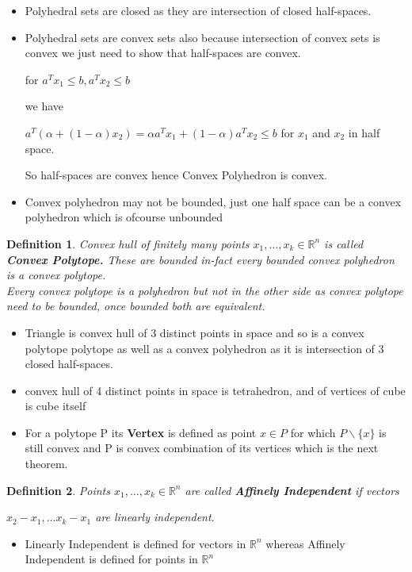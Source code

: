 \documentclass[oneside]{book}
\newtheorem{mydef}{Definition}
\begin{document}
\begin{itemize}
\item
 Polyhedral sets are closed as they are intersection of closed half-spaces. 
  \item
 Polyhedral sets  are convex sets  also because intersection of convex sets is convex we just need to show that half-spaces are convex.\par
   for $a^{T} x_{1} \leq b, a^{T} x_{2} \leq b$ \par 
 we have 
 
 $a^{T}\left(\alpha +(1- \alpha) x_{2}\right)=\alpha a^{T} x_{1}+(1-\alpha) a^{T} x_{2} \leq b$ 
  for $x_{1} $ and $x_{2}$ in half space.  \par
  So half-spaces are convex hence  Convex Polyhedron  is convex.\par 
  \item
   Convex polyhedron may not be bounded, just one half space can be a convex polyhedron which is ofcourse unbounded 
   \end{itemize}
   
  \begin{mydef}
  
  Convex hull of finitely many points $x_1,\ldots ,x_k \in \mathbb{R}^n $ is called \textbf{Convex Polytope.} 
 These are bounded in-fact every bounded convex polyhedron  is a convex polytope.\\
  Every convex polytope is a polyhedron but not in the other side as convex  polytope need to be bounded, once bounded both are equivalent.
 
 
  \end{mydef}
  

\begin{itemize}
\item

Triangle is convex hull of 3 distinct points in space and so is a convex polytope polytope as well as a convex polyhedron as it is intersection of 3 closed half-spaces.

\item
  convex hull of 4 distinct points in space is tetrahedron, and of vertices of cube is cube itself 
 
 \item
 For a polytope P its \textbf{Vertex} is defined as point $x \in P$ for which $P \backslash \{x\} $ is  still convex and P is convex combination of its vertices which is  the next theorem. 
 \end{itemize}
\begin{mydef}

 Points $ x_1, \ldots ,x_k \in \mathbb{R}^n $ are called \textbf{Affinely Independent} if vectors \par
 $x_{2} - x_{1}, \ldots  x_{k} - x_{1} $ are linearly independent.
 \end{mydef}  
 \begin{itemize}
 \item Linearly Independent is defined for vectors in $\mathbb{R}^n $ whereas Affinely Independent is defined for points in $\mathbb{R}^n $
 \end{itemize}
\end{document}
